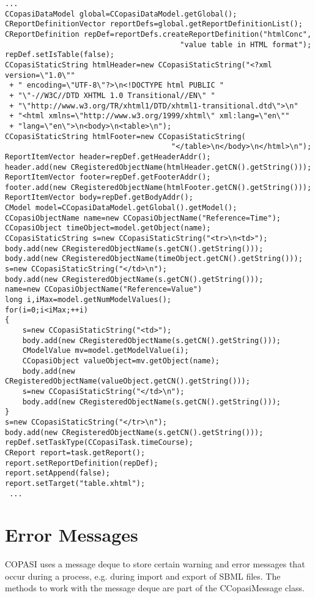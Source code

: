 \documentclass[a4,10pt]{article}
\begin{document}
\begin{lstlisting}
...
CCopasiDataModel global=CCopasiDataModel.getGlobal();
CReportDefinitionVector reportDefs=global.getReportDefinitionList();
CReportDefinition repDef=reportDefs.createReportDefinition("htmlConc",
                                        "value table in HTML format");
repDef.setIsTable(false);
CCopasiStaticString htmlHeader=new CCopasiStaticString("<?xml version=\"1.0\"" 
 + " encoding=\"UTF-8\"?>\n<!DOCTYPE html PUBLIC "
 + "\"-//W3C//DTD XHTML 1.0 Transitional//EN\" "
 + "\"http://www.w3.org/TR/xhtml1/DTD/xhtml1-transitional.dtd\">\n"
 + "<html xmlns=\"http://www.w3.org/1999/xhtml\" xml:lang=\"en\""
 + "lang=\"en\">\n<body>\n<table>\n");
CCopasiStaticString htmlFooter=new CCopasiStaticString(
                                      "</table>\n</body>\n</html>\n");
ReportItemVector header=repDef.getHeaderAddr(); 
header.add(new CRegisteredObjectName(htmlHeader.getCN().getString()));
ReportItemVector footer=repDef.getFooterAddr(); 
footer.add(new CRegisteredObjectName(htmlFooter.getCN().getString()));
ReportItemVector body=repDef.getBodyAddr(); 
CModel model=CCopasiDataModel.getGlobal().getModel();
CCopasiObjectName name=new CCopasiObjectName("Reference=Time");
CCopasiObject timeObject=model.getObject(name);
CCopasiStaticString s=new CCopasiStaticString("<tr>\n<td>");
body.add(new CRegisteredObjectName(s.getCN().getString()));
body.add(new CRegisteredObjectName(timeObject.getCN().getString()));
s=new CCopasiStaticString("</td>\n");
body.add(new CRegisteredObjectName(s.getCN().getString()));
name=new CCopasiObjectName("Reference=Value")
long i,iMax=model.getNumModelValues();
for(i=0;i<iMax;++i)
{
    s=new CCopasiStaticString("<td>");
    body.add(new CRegisteredObjectName(s.getCN().getString()));
    CModelValue mv=model.getModelValue(i);
    CCopasiObject valueObject=mv.getObject(name);
    body.add(new CRegisteredObjectName(valueObject.getCN().getString()));
    s=new CCopasiStaticString("</td>\n");
    body.add(new CRegisteredObjectName(s.getCN().getString()));
}
s=new CCopasiStaticString("</tr>\n");
body.add(new CRegisteredObjectName(s.getCN().getString()));
repDef.setTaskType(CCopasiTask.timeCourse);
CReport report=task.getReport();
report.setReportDefinition(repDef);
report.setAppend(false);
report.setTarget("table.xhtml");
 ...
\end{lstlisting}

\section{Error Messages}
\label{ErrorMessages}
COPASI uses a message deque to store certain warning and error messages that occur during a process, e.g. during import and export of SBML files.
The methods to work with the message deque are part of the CCopasiMessage class.
\end{document}
